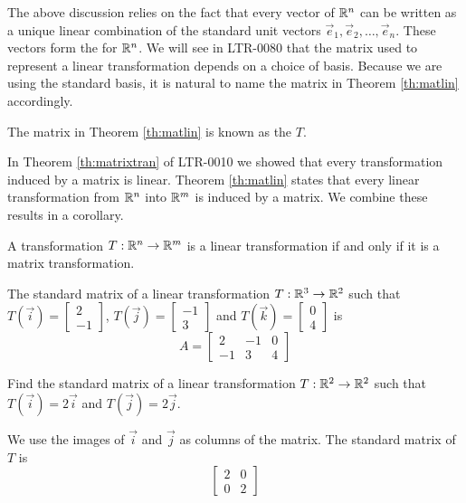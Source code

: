 \documentclass{ximera}
\begin{document}
The above discussion relies on the fact that every vector of $\mathbb{R}^n$ can be written as a unique linear combination of the standard unit vectors $\vec{e}_1,\vec{e}_2,\dots,\vec{e}_n$.  These vectors form the  for $\mathbb{R}^n$.  We will see in LTR-0080 that the matrix used to represent a linear transformation depends on a choice of basis.  Because we are using the standard basis, it is natural to name the matrix in Theorem \ref{th:matlin} accordingly.


\begin{definition} \label{def:standardmatoflintrans}
  
The matrix in Theorem \ref{th:matlin} is known as the  $T$.
  
\end{definition}


In Theorem \ref{th:matrixtran} of LTR-0010 we showed that every transformation induced by a matrix is linear.  Theorem \ref{th:matlin} states that every linear transformation from $\mathbb{R}^n$ into $\mathbb{R}^m$ is induced by a matrix.  We combine these results in a corollary.


  \begin{corollary}\label{cor:lintransmattrans} A transformation $T:\mathbb{R}^n\rightarrow\mathbb{R}^m$ is a linear transformation if and only if it is a matrix transformation.
\end{corollary}


 \begin{example}\label{ex:findmatrix2}
 The standard matrix of a linear transformation $T:\mathbb{R}^3\rightarrow \mathbb{R}^2$ such that $T(\vec{i})=\begin{bmatrix}2\\-1\end{bmatrix}$, $T(\vec{j})=\begin{bmatrix}-1\\3\end{bmatrix}$ and $T(\vec{k})=\begin{bmatrix}0\\4\end{bmatrix}$ is
 $$A=\begin{bmatrix}2&-1&0\\-1&3&4\end{bmatrix}$$
 \end{example}
 
 \begin{example}\label{ex:findmatrix}
Find the standard matrix of a linear transformation $T:\mathbb{R}^2\rightarrow \mathbb{R}^2$ such that $T(\vec{i})=2\vec{i}$ and $T(\vec{j})=2\vec{j}$.  
\begin{explanation}
We use the images of $\vec{i}$ and $\vec{j}$ as columns of the matrix.  The standard matrix of $T$ is
$$\begin{bmatrix}2&0\\0&2\end{bmatrix}$$
\end{explanation}
\end{example}
 
\end{document}
